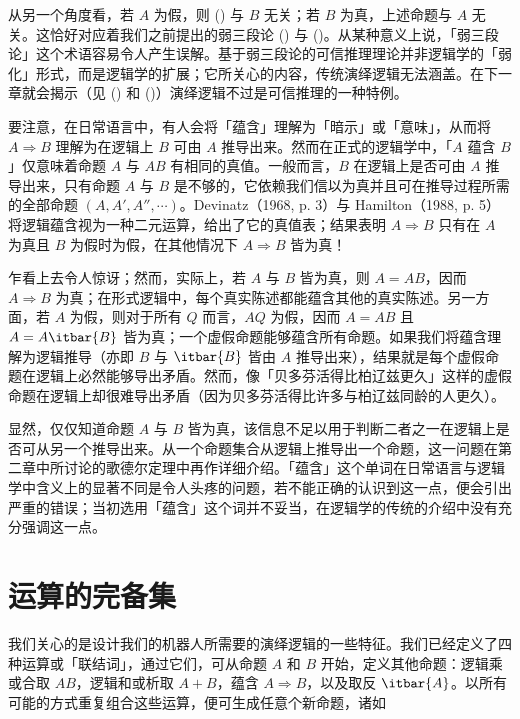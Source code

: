 从另一个角度看，若 $A$ 为假，则 (\in[implication]) 与 $B$ 无关；若 $B$ 为真，上述命题与 $A$ 无关。这恰好对应着我们之前提出的弱三段论 (\in[weak-1]) 与 (\in[weak-2])。从某种意义上说，「弱三段论」这个术语容易令人产生误解。基于弱三段论的可信推理理论并非逻辑学的「弱化」形式，而是逻辑学的扩展；它所关心的内容，传统演绎逻辑无法涵盖。在下一章就会揭示（见 (\in[2-69]) 和 (\in[2-70])）演绎逻辑不过是可信推理的一种特例。

\blank[big]
\blank[small]

要注意，在日常语言中，有人会将「蕴含」理解为「暗示」或「意味」，从而将 $A\Rightarrow B$ 理解为在逻辑上 $B$ 可由 $A$ 推导出来。然而在正式的逻辑学中，「$A$ 蕴含 $B$」仅意味着命题 $A$ 与 $AB$ 有相同的真值。一般而言，$B$ 在逻辑上是否可由 $A$ 推导出来，只有命题 $A$ 与 $B$ 是不够的，它依赖我们信以为真并且可在推导过程所需的全部命题 $(A, A', A'',\cdots)$。Devinatz（1968, p. 3）与 Hamilton（1988, p. 5）将逻辑蕴含视为一种二元运算，给出了它的真值表；结果表明 $A\Rightarrow B$ 只有在 $A$ 为真且 $B$ 为假时为假，在其他情况下 $A\Rightarrow B$  皆为真！

乍看上去令人惊讶；然而，实际上，若 $A$ 与 $B$ 皆为真，则 $A = AB$，因而 $A\Rightarrow B$ 为真；在形式逻辑中，每个真实陈述都能蕴含其他的真实陈述。另一方面，若 $A$ 为假，则对于所有 $Q$ 而言，$AQ$ 为假，因而 $A = AB$ 且 $A = A\itbar{B}$ 皆为真；一个虚假命题能够蕴含所有命题。如果我们将蕴含理解为逻辑推导（亦即 $B$ 与 $\itbar{B}$ 皆由 $A$ 推导出来），结果就是每个虚假命题在逻辑上必然能够导出矛盾。然而，像「贝多芬活得比柏辽兹更久」这样的虚假命题在逻辑上却很难导出矛盾（因为贝多芬活得比许多与柏辽兹同龄的人更久）。

显然，仅仅知道命题 $A$ 与 $B$ 皆为真，该信息不足以用于判断二者之一在逻辑上是否可从另一个推导出来。从一个命题集合从逻辑上推导出一个命题，这一问题在第二章中所讨论的歌德尔定理中再作详细介绍。「蕴含」这个单词在日常语言与逻辑学中含义上的显著不同是令人头疼的问题，若不能正确的认识到这一点，便会引出严重的错误；当初选用「蕴含」这个词并不妥当，在逻辑学的传统的介绍中没有充分强调这一点。

\section{运算的完备集}

我们关心的是设计我们的机器人所需要的演绎逻辑的一些特征。我们已经定义了四种运算或「联结词」，通过它们，可从命题 $A$ 和 $B$ 开始，定义其他命题：逻辑乘或合取 $AB$，逻辑和或析取 $A + B$，蕴含 $A\Rightarrow B$，以及取反 $\itbar{A}$。以所有可能的方式重复组合这些运算，便可生成任意个新命题，诸如

